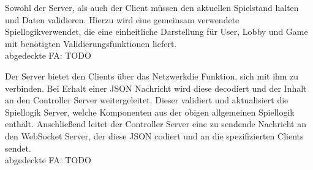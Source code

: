 Sowohl der Server, als auch der Client müssen den aktuellen Spielstand halten und Daten validieren. Hierzu wird eine gemeinsam verwendete \glqq Spiellogik\grqq verwendet, die eine einheitliche Darstellung für User, Lobby und Game mit benötigten Validierungsfunktionen liefert.\\
abgedeckte FA: TODO\\


Der Server bietet den Clients über das \glqq Netzwerk\grqq die Funktion, sich mit ihm zu verbinden. Bei Erhalt einer JSON Nachricht wird diese decodiert und der Inhalt an den Controller Server weitergeleitet. Dieser validiert und aktualisiert die Spiellogik Server, welche Komponenten aus der obigen allgemeinen Spiellogik enthält. Anschließend leitet der Controller Server eine zu sendende Nachricht an den WebSocket Server, der diese JSON codiert und an die spezifizierten Clients sendet.\\ 
abgedeckte FA: TODO\\

